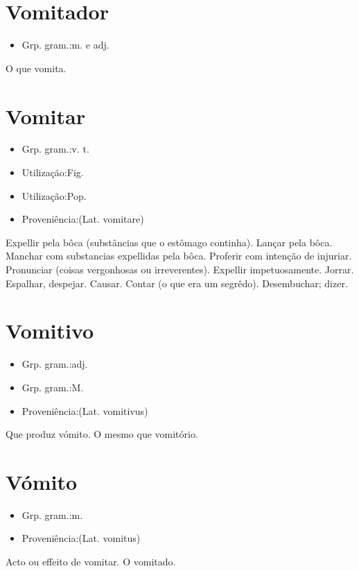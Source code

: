 \documentclass{article}
\begin{document}
\section{Vomitador}
\begin{itemize}
\item {Grp. gram.:m.  e  adj.}
\end{itemize}
O que vomita.
\section{Vomitar}
\begin{itemize}
\item {Grp. gram.:v. t.}
\end{itemize}
\begin{itemize}
\item {Utilização:Fig.}
\end{itemize}
\begin{itemize}
\item {Utilização:Pop.}
\end{itemize}
\begin{itemize}
\item {Proveniência:(Lat. \textunderscore vomitare\textunderscore )}
\end{itemize}
Expellir pela bôca (substâncias que o estômago continha).
Lançar pela bôca.
Manchar com substancias expellidas pela bôca.
Proferir com intenção de injuriar.
Pronunciar (coisas vergonhosas ou irreverentes).
Expellir impetuosamente.
Jorrar.
Espalhar, despejar.
Causar.
Contar (o que era um segrêdo).
Desembuchar; dizer.
\section{Vomitivo}
\begin{itemize}
\item {Grp. gram.:adj.}
\end{itemize}
\begin{itemize}
\item {Grp. gram.:M.}
\end{itemize}
\begin{itemize}
\item {Proveniência:(Lat. \textunderscore vomitivus\textunderscore )}
\end{itemize}
Que produz vómito.
O mesmo que \textunderscore vomitório\textunderscore .
\section{Vómito}
\begin{itemize}
\item {Grp. gram.:m.}
\end{itemize}
\begin{itemize}
\item {Proveniência:(Lat. \textunderscore vomitus\textunderscore )}
\end{itemize}
Acto ou effeito de vomitar.
O vomitado.
\end{document}
